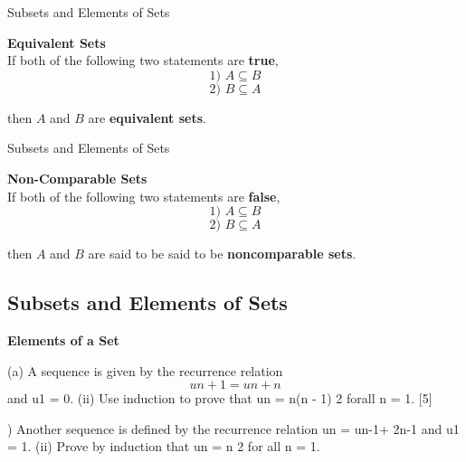 {Subsets and Elements of Sets}

\textbf{Equivalent Sets}\\
If both of the following two statements are \textbf{true}, 
\[\mbox{1)  } A \subseteq B \]
\[\mbox{2)  } B \subseteq A \]

then $A$ and $B$ are \textbf{equivalent sets}.






{Subsets and Elements of Sets}

\textbf{Non-Comparable Sets}\\
If both of the following two statements are \textbf{false}, 
\[\mbox{1)  } A \subseteq B \]
\[\mbox{2)  } B \subseteq A \]

then $A$ and $B$ are said to be said to be \textbf{noncomparable sets}.





\subsection{Subsets and Elements of Sets}
\textbf{Elements of a Set}\\



\newpage

(a) A sequence is given by the recurrence relation
\[un+1 = un + n \]and u1 = 0.
(ii) Use induction to prove that
un =
n(n - 1)
2
forall n = 1.
[5]

) Another sequence is defined by the recurrence relation un = un-1+ 2n-1 and
u1 = 1.
(ii) Prove by induction that un = n
2
for all n = 1.
 
